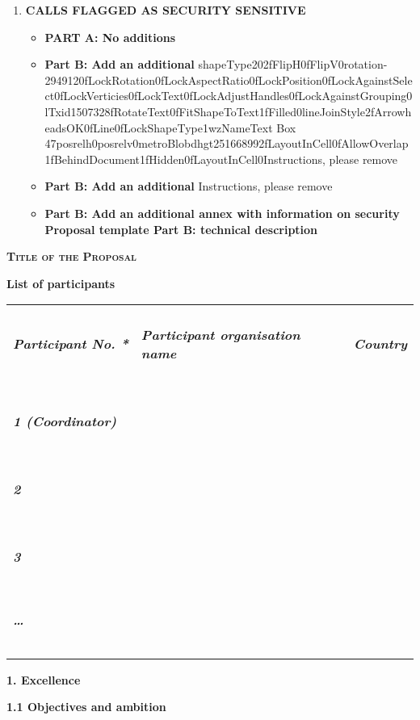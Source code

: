 \begin{enumerate}
\def\labelenumi{\arabic{enumi}.}
\item
  \textbf{CALLS FLAGGED AS SECURITY SENSITIVE}

  \begin{itemize}
  \item
    \textbf{PART A: No additions}
  \item
    \textbf{Part B: Add an additional
    }shapeType202fFlipH0fFlipV0rotation-2949120fLockRotation0fLockAspectRatio0fLockPosition0fLockAgainstSelect0fLockVerticies0fLockText0fLockAdjustHandles0fLockAgainstGrouping0lTxid1507328fRotateText0fFitShapeToText1fFilled0lineJoinStyle2fArrowheadsOK0fLine0fLockShapeType1wzNameText
    Box
    47posrelh0posrelv0metroBlobdhgt251668992fLayoutInCell0fAllowOverlap1fBehindDocument1fHidden0fLayoutInCell0Instructions,
    please remove
  \item
    \textbf{Part B: Add an additional }Instructions, please remove
  \item
    \textbf{Part B: Add an additional annex with information on security
    Proposal template Part B: technical description}
  \end{itemize}
\end{enumerate}

\textbf{\textsc{Title of the Proposal}}

\textbf{List of participants}

\begin{longtable}[]{@{}
  >{\raggedright\arraybackslash}p{}
  >{\raggedright\arraybackslash}p{}
  >{\raggedright\arraybackslash}p{}@{}}
\toprule
\endhead
\subparagraph{Participant No. *} & \subparagraph{Participant
organisation name} & \subparagraph{Country} \\
& & \\
\subparagraph{1 (Coordinator)} & & \\
& & \\
\subparagraph{2} & & \\
& & \\
\subparagraph{3} & & \\
\subparagraph{\ldots{}} & & \\
& & \\
\bottomrule
\end{longtable}

\textbf{1. Excellence}

\textbf{1.1 Objectives and ambition }

